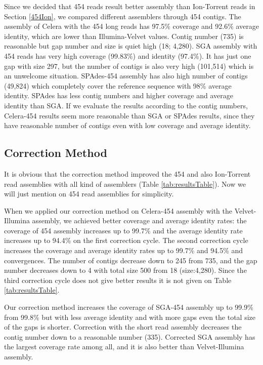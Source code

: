 \documentclass{llncs}
\begin{document}
Since we decided that 454 reads result better assembly than Ion-Torrent reads in Section \ref{454Ion}, we compared different assemblers through 454 contigs. The assembly of Celera with the 454 long reads has 97.5\% coverage and 92.6\% average identity, which are lower than Illumina-Velvet values. Contig number (735) is reasonable but gap number and size is quiet high (18; 4,280). 
SGA assembly with 454 reads has very high coverage (99.83\%) and identity (97.4\%). It has just one gap with size 297, but the number of contigs is also very high (101,514) which is an unwelcome situation. SPAdes-454 assembly has also high number of contigs (49,824) which completely cover the reference sequence with 98\% average identity. SPAdes has less contig numbers and higher coverage and average identity than SGA. 
If we evaluate the results according to the contig numbers, Celera-454 results seem more reasonable than SGA or SPAdes results, since they have reasonable number of contigs even with low coverage and average identity.

\subsection{Correction Method}

It is obvious that the correction method improved the 454 and also Ion-Torrent read assemblies with all kind of assemblers (Table \ref{tab:resultsTable}). Now we will just mention on 454 read assemblies for simplicity.

When we applied our correction method on Celera-454 assembly with the Velvet-Illumina assembly, we achieved better coverage and average identity rates: the coverage of 454 assembly increases up to 99.7\% and the average identity rate increases up to 94.4\% on the first correction cycle. The second correction cycle increases the coverage and average identity rates up to 99.7\% and 94.5\% and convergences. The number of contigs decrease down to 245 from 735, and the gap number decreases down to 4 with total size 500 from 18 (size:4,280). Since the third correction cycle does not give better results it is not given on Table \ref{tab:resultsTable}.

Our correction method increases the coverage of SGA-454 assembly up to 99.9\% from 99.8\% but with less average identity and with more gaps even the total size of the gaps is shorter. Correction with the short read assembly decreases the contig number down to a reasonable number (335). Corrected SGA assembly has the largest coverage rate among all, and it is also better than Velvet-Illumina assembly.
\end{document}
